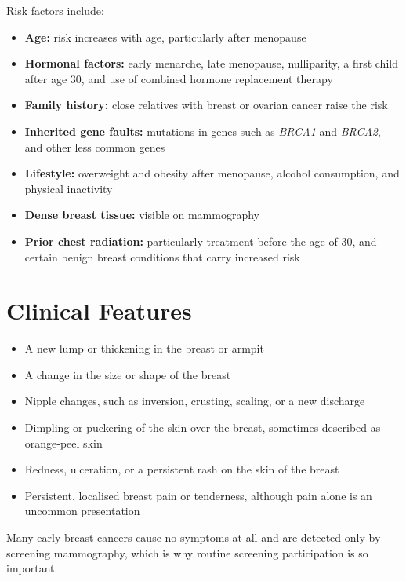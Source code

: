 Risk factors include:

\begin{itemize}
    \item \textbf{Age:} risk increases with age, particularly after menopause
    \item \textbf{Hormonal factors:} early menarche, late menopause, nulliparity, a first child after age 30, and use of combined hormone replacement therapy
    \item \textbf{Family history:} close relatives with breast or ovarian cancer raise the risk
    \item \textbf{Inherited gene faults:} mutations in genes such as \textit{BRCA1} and \textit{BRCA2}, and other less common genes
    \item \textbf{Lifestyle:} overweight and obesity after menopause, alcohol consumption, and physical inactivity
    \item \textbf{Dense breast tissue:} visible on mammography
    \item \textbf{Prior chest radiation:} particularly treatment before the age of 30, and certain benign breast conditions that carry increased risk
\end{itemize}

\section*{Clinical Features}
\begin{itemize}
    \item A new lump or thickening in the breast or armpit
    \item A change in the size or shape of the breast
    \item Nipple changes, such as inversion, crusting, scaling, or a new discharge
    \item Dimpling or puckering of the skin over the breast, sometimes described as orange-peel skin
    \item Redness, ulceration, or a persistent rash on the skin of the breast
    \item Persistent, localised breast pain or tenderness, although pain alone is an uncommon presentation
\end{itemize}

Many early breast cancers cause no symptoms at all and are detected only by screening mammography, which is why routine screening participation is so important.

